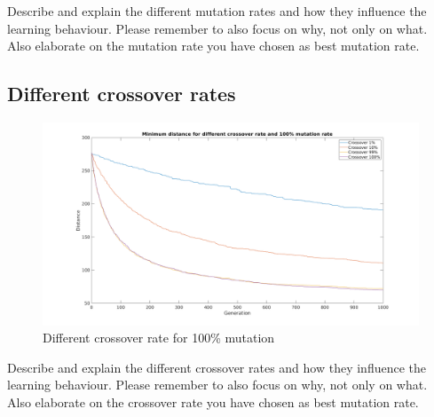 \documentclass[a4paper, 12pt]{article}
\begin{document}
Describe and explain the different mutation rates and how they influence the learning behaviour. Please remember to also focus on why, not only on what.
Also elaborate on the mutation rate you have chosen as best mutation rate.

\newpage
\subsection{Different crossover rates}


\begin{figure}[ht!]
  \centering
  \includegraphics[width=1.0\textwidth]{images/mutfig-mine}
    \caption{Different crossover rate for 100\% mutation \label{fig:mutfig}}
\end{figure}

Describe and explain the different crossover rates and how they influence the learning behaviour. Please remember to also focus on why, not only on what.
Also elaborate on the crossover rate you have chosen as best mutation rate.
\end{document}
